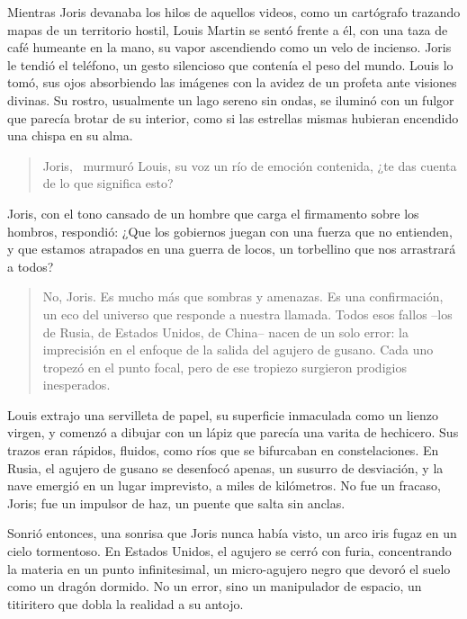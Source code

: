 Mientras Joris devanaba los hilos de aquellos videos, como un cartógrafo trazando mapas de un territorio hostil, Louis Martin se sentó frente a él, con una taza de café humeante en la mano, su vapor ascendiendo como un velo de incienso. Joris le tendió el teléfono, un gesto silencioso que contenía el peso del mundo. Louis lo tomó, sus ojos absorbiendo las imágenes con la avidez de un profeta ante visiones divinas. Su rostro, usualmente un lago sereno sin ondas, se iluminó con un fulgor que parecía brotar de su interior, como si las estrellas mismas hubieran encendido una chispa en su alma.

\begin{quote}
\calli
\glqq Joris,\grqq~ murmuró Louis, su voz un río de emoción contenida, \glqq ¿te das cuenta de lo que significa esto?\grqq
\end{quote}

Joris, con el tono cansado de un hombre que carga el firmamento sobre los hombros, respondió: \glqq ¿Que los gobiernos juegan con una fuerza que no entienden, y que estamos atrapados en una guerra de locos, un torbellino que nos arrastrará a todos?\grqq

\begin{quote}
\calli
\glqq No, Joris. Es mucho más que sombras y amenazas. Es una confirmación, un eco del universo que responde a nuestra llamada. Todos esos fallos --los de Rusia, de Estados Unidos, de China-- nacen de un solo error: la imprecisión en el enfoque de la salida del agujero de gusano. Cada uno tropezó en el punto focal, pero de ese tropiezo surgieron prodigios inesperados.\grqq
\end{quote}

Louis extrajo una servilleta de papel, su superficie inmaculada como un lienzo virgen, y comenzó a dibujar con un lápiz que parecía una varita de hechicero. Sus trazos eran rápidos, fluidos, como ríos que se bifurcaban en constelaciones. \glqq En Rusia, el agujero de gusano se desenfocó apenas, un susurro de desviación, y la nave emergió en un lugar imprevisto, a miles de kilómetros. No fue un fracaso, Joris; fue un impulsor de haz, un puente que salta sin anclas.\grqq

Sonrió entonces, una sonrisa que Joris nunca había visto, un arco iris fugaz en un cielo tormentoso. \glqq En Estados Unidos, el agujero se cerró con furia, concentrando la materia en un punto infinitesimal, un micro-agujero negro que devoró el suelo como un dragón dormido. No un error, sino un manipulador de espacio, un titiritero que dobla la realidad a su antojo.\grqq

